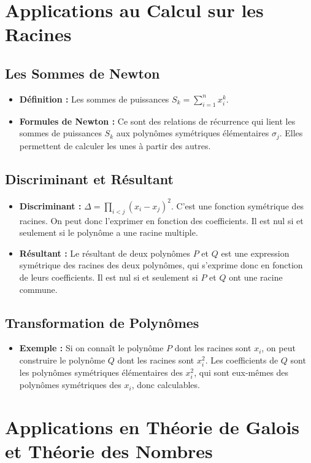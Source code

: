 \documentclass[12pt, a4paper, parskip=full]{report}
\theoremstyle{agregstyle}
\begin{document}
\section{Applications au Calcul sur les Racines}
\subsection{Les Sommes de Newton}
\begin{itemize}
    \item \textbf{Définition :} Les sommes de puissances $S_k = \sum_{i=1}^n x_i^k$.
    \item \textbf{Formules de Newton :} Ce sont des relations de récurrence qui lient les sommes de puissances $S_k$ aux polynômes symétriques élémentaires $\sigma_j$. Elles permettent de calculer les unes à partir des autres.
\end{itemize}
\subsection{Discriminant et Résultant}
\begin{itemize}
    \item \textbf{Discriminant :} $\Delta = \prod_{i<j} (x_i-x_j)^2$. C'est une fonction symétrique des racines. On peut donc l'exprimer en fonction des coefficients. Il est nul si et seulement si le polynôme a une racine multiple.
    \item \textbf{Résultant :} Le résultant de deux polynômes $P$ et $Q$ est une expression symétrique des racines des deux polynômes, qui s'exprime donc en fonction de leurs coefficients. Il est nul si et seulement si $P$ et $Q$ ont une racine commune.
\end{itemize}
\subsection{Transformation de Polynômes}
\begin{itemize}
    \item \textbf{Exemple :} Si on connaît le polynôme $P$ dont les racines sont $x_i$, on peut construire le polynôme $Q$ dont les racines sont $x_i^2$. Les coefficients de $Q$ sont les polynômes symétriques élémentaires des $x_i^2$, qui sont eux-mêmes des polynômes symétriques des $x_i$, donc calculables.
\end{itemize}

\section{Applications en Théorie de Galois et Théorie des Nombres}
\end{document}
